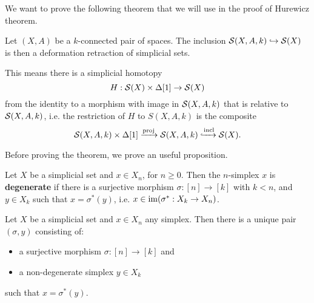 We want to prove the following theorem that we will use in the proof of Hurewicz theorem.

\begin{theorem**}
Let $(X,A)$ be a $k$-connected pair of spaces. The inclusion $\S(X,A,k)\hto\S(X)$ is then a deformation retraction of simplicial sets.
\end{theorem**}

This means there is a simplicial homotopy
\[H:\S(X)\times\Delta[1]\to \S(X)\]
from the identity to a morphism with image in $\S(X,A,k)$ that is relative to $\S(X,A,k)$, i.e. the restriction of $H$ to $S(X,A,k)$ is the composite
\[\S(X,A,k)\times\Delta[1]\xto{\text{proj}}\S(X,A,k)\xhto{\text{incl}}\S(X).\]

Before proving the theorem, we prove an useful proposition.

Let $X$ be a simplicial set and $x\in X_n$, for $n\geq0$. Then the $n$-simplex $x$ is \textbf{degenerate} if there is a surjective morphism $\sigma:[n]\to [k]$ with $k<n$, and $y\in X_k$ such that $x=\sigma^*(y)$, i.e. $x\in\im(\sigma^*:X_k\to X_n)$.

\begin{proposition}\label{proposition:non-degenerate-simplices}
Let $X$ be a simplicial set and $x\in X_n$ any simplex. Then there is a unique pair $(\sigma,y)$ consisting of:
\begin{itemize}[label={-}]
    \item a surjective morphism $\sigma: [n]\to [k]$ and
    \item a non-degenerate simplex $y\in X_k$
\end{itemize}
such that $x=\sigma^*(y)$.
\end{proposition}


